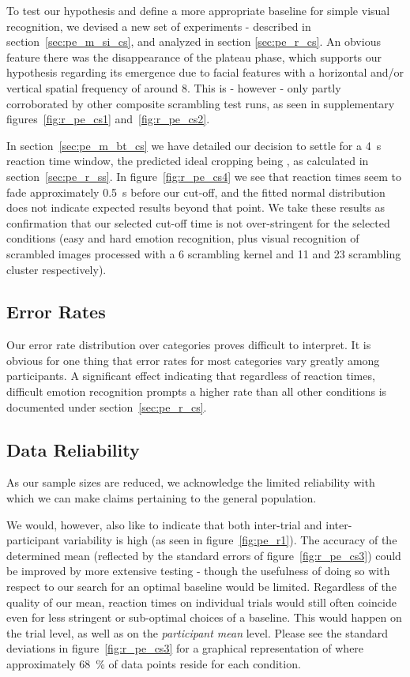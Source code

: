 	    To test our hypothesis and define a more appropriate baseline for simple visual recognition, we devised a new set of experiments - described in section~\ref{sec:pe_m_si_cs}, and analyzed in section \ref{sec:pe_r_cs}.
	    An obvious feature there was the disappearance of the plateau phase, which supports our hypothesis regarding its emergence due to facial features with a horizontal and/or vertical spatial frequency of around \SI{8}{\pixel}.
	    This is - however - only partly corroborated by other composite scrambling test runs, as seen in supplementary figures~\ref{fig:r_pe_cs1} and~\ref{fig:r_pe_cs2}.
	    
	    In section~\ref{sec:pe_m_bt_cs} we have detailed our decision to settle for a \SI{4}{\second} reaction time window, the predicted ideal cropping being , as calculated in section~\ref{sec:pe_r_ss}.
	    In figure~\ref{fig:r_pe_cs4} we see that reaction times seem to fade approximately \SI{0.5}{\second} before our cut-off, and the fitted normal distribution does not indicate expected results beyond that point.
	    We take these results as confirmation that our selected cut-off time is not over-stringent for the selected conditions (easy and hard emotion recognition, plus visual recognition of scrambled images processed with a \SI{6}{\pixel} scrambling kernel and \SI{11}{\pixel} and \SI{23}{\pixel} scrambling cluster respectively).
	\subsection{Error Rates}
	    Our error rate distribution over categories proves difficult to interpret.
	    It is obvious for one thing that error rates for most categories vary greatly among participants.
	    A significant effect indicating that regardless of reaction times, difficult emotion recognition prompts a higher rate than all other conditions is documented under section~\ref{sec:pe_r_cs}.
	\subsection{Data Reliability}
	    As our sample sizes are reduced, we acknowledge the limited reliability with which we can make claims pertaining to the general population. 
	
	    We would, however, also like to indicate that both inter-trial and inter-participant variability is high (as seen in figure~\ref{fig:pe_r1}).
	    The accuracy of the determined mean (reflected by the standard errors of figure~\ref{fig:r_pe_cs3}) could be improved by more extensive testing - though the usefulness of doing so with respect to our search for an optimal baseline would be limited.
	    Regardless of the quality of our mean, reaction times on individual trials would still often coincide even for less stringent or sub-optimal choices of a baseline.  
	    This would happen on the trial level, as well as on the \textit{participant mean} level.
	    Please see the standard deviations in figure~\ref{fig:r_pe_cs3} for a graphical representation of where approximately \SI{68}{\percent} of data points reside for each condition.
